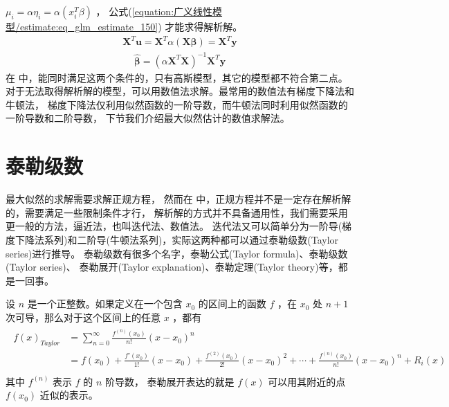 \documentclass[letterpaper,10pt,english]{sphinxmanual}
\begin{document}
\(\mu_i = \alpha \eta_i = \alpha (x_i^T \beta)\)
， 公式(\ref{equation:广义线性模型/estimate:eq_glm_estimate_150})
才能求得解析解。
\begin{equation}\label{equation:广义线性模型/estimate:广义线性模型/estimate:19}
\begin{split}\pmb{X}^T \pmb{u} = \pmb{X}^T \alpha (\pmb{X} \pmb{\beta} ) = \pmb{X}^T  \pmb{y}\end{split}
\end{equation}\begin{equation}\label{equation:广义线性模型/estimate:广义线性模型/estimate:20}
\begin{split}\hat{\pmb{\beta}} = ( \alpha \pmb{X}^T \pmb{X})^{-1}\pmb{X}^T \pmb{y}\end{split}
\end{equation}
在  中，能同时满足这两个条件的，只有高斯模型，其它的模型都不符合第二点。
对于无法取得解析解的模型，可以用数值法求解。最常用的数值法有梯度下降法和牛顿法，
梯度下降法仅利用似然函数的一阶导数，而牛顿法同时利用似然函数的一阶导数和二阶导数，
下节我们介绍最大似然估计的数值求解法。


\section{泰勒级数}
\label{\detokenize{_u5e7f_u4e49_u7ebf_u6027_u6a21_u578b/estimate:id3}}
最大似然的求解需要求解正规方程，
然而在  中，正规方程并不是一定存在解析解的，需要满足一些限制条件才行，
解析解的方式并不具备通用性，我们需要采用更一般的方法，逼近法，也叫迭代法、数值法。
迭代法又可以简单分为一阶导(梯度下降法系列)和二阶导(牛顿法系列)，实际这两种都可以通过泰勒级数(Taylor series)进行推导。
泰勒级数有很多个名字，泰勒公式(Taylor formula)、泰勒级数(Taylor series)、
泰勒展开(Taylor explanation)、泰勒定理(Taylor theory)等，都是一回事。

设 \(n\) 是一个正整数。如果定义在一个包含 \(x_0\) 的区间上的函数 \(f\)
，在 \(x_0\)
处 \(n+1\) 次可导，那么对于这个区间上的任意 \(x\) ，都有
\begin{align}\label{equation:广义线性模型/estimate:广义线性模型/estimate:21}\!\begin{aligned}
f(x)_{Taylor}  &= \sum_{n=0}^{\infty} \frac{f^{(n)}(x_0)}{n!}  (x - x_0)^n\\
&= f(x_0) + \frac{f'(x_0)}{1!}(x-x_0) + \frac{f^{(2)}(x_0)}{2!}(x-x_0)^2+ \cdots + \frac{f^{(n)}(x_0)}{n!}(x-x_0)^n + R_i(x)\\
\end{aligned}\end{align}
其中 \(f^{(n)}\) 表示 \(f\) 的 \(n\) 阶导数，
泰勒展开表达的就是 \(f(x)\) 可以用其附近的点 \(f(x_0)\) 近似的表示。
\end{document}
